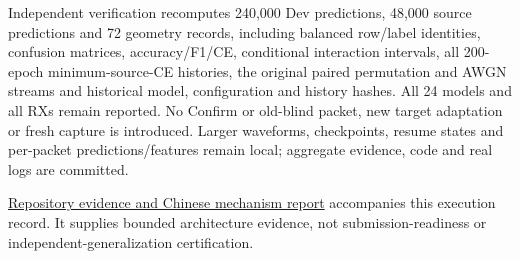 \documentclass[10pt]{article}
\begin{document}
Independent verification recomputes 240,000 Dev predictions, 48,000 source predictions and 72 geometry records, including balanced row/label identities, confusion matrices, accuracy/F1/CE, conditional interaction intervals, all 200-epoch minimum-source-CE histories, the original paired permutation and AWGN streams and historical model, configuration and history hashes. All 24 models and all RXs remain reported. No Confirm or old-blind packet, new target adaptation or fresh capture is introduced. Larger waveforms, checkpoints, resume states and per-packet predictions/features remain local; aggregate evidence, code and real logs are committed.

\href{https://github.com/hanCChan/crossatten/tree/exp/s27b-backend-interaction/27b-tokenizer-backend-interaction}{Repository evidence and Chinese mechanism report} accompanies this execution record. It supplies bounded architecture evidence, not submission-readiness or independent-generalization certification.
\end{document}
